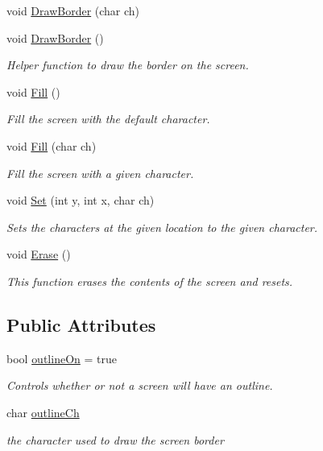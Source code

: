 \begin{DoxyCompactItemize}
void \hyperlink{classScreen_abe4420082458330e5c853c342b201956}{Draw\-Border} (char ch)
\item 
void \hyperlink{classScreen_a146a94183c6c610ae8a619521fc9d102}{Draw\-Border} ()
\begin{DoxyCompactList}\small\item\em Helper function to draw the border on the screen. \end{DoxyCompactList}\item 
void \hyperlink{classScreen_a8cf89892a333f7d6e7227ffdf77b3351}{Fill} ()
\begin{DoxyCompactList}\small\item\em Fill the screen with the default character. \end{DoxyCompactList}\item 
void \hyperlink{classScreen_aeeebb297b5f39c2b25ee026df8fec9ac}{Fill} (char ch)
\begin{DoxyCompactList}\small\item\em Fill the screen with a given character. \end{DoxyCompactList}\item 
void \hyperlink{classScreen_ab035671163a5cabee7611c7c456b1c56}{Set} (int y, int x, char ch)
\begin{DoxyCompactList}\small\item\em Sets the characters at the given location to the given character. \end{DoxyCompactList}\item 
void \hyperlink{classScreen_a7e2c21a6e63390eb3d8b46ee85af05d2}{Erase} ()
\begin{DoxyCompactList}\small\item\em This function erases the contents of the screen and resets. \end{DoxyCompactList}\end{DoxyCompactItemize}
\subsection*{Public Attributes}
\begin{DoxyCompactItemize}
\item 
bool \hyperlink{classScreen_a6f906b745f406576d9f7aeaec330c9d6}{outline\-On} = true
\begin{DoxyCompactList}\small\item\em Controls whether or not a screen will have an outline. \end{DoxyCompactList}\item 
char \hyperlink{classScreen_a0b59df2bfafff7a121286a5ea40503b6}{outline\-Ch}
\begin{DoxyCompactList}\small\item\em the character used to draw the screen border \end{DoxyCompactList}\end{DoxyCompactItemize}
